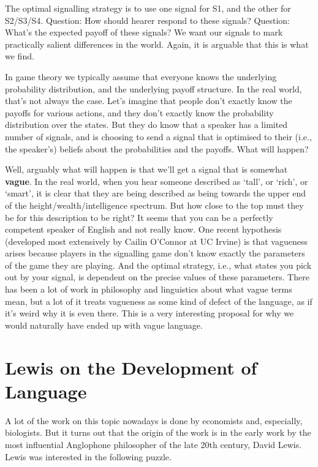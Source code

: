 \documentclass[11pt,]{article}
\begin{document}
The optimal signalling strategy is to use one signal for S1, and the
other for S2/S3/S4. Question: How should hearer respond to these
signals? Question: What's the expected payoff of these signals? We want
our signals to mark practically salient differences in the world. Again,
it is arguable that this is what we find.

In game theory we typically assume that everyone knows the underlying
probability distribution, and the underlying payoff structure. In the
real world, that's not always the case. Let's imagine that people don't
exactly know the payoffs for various actions, and they don't exactly
know the probability distribution over the states. But they do know that
a speaker has a limited number of signals, and is choosing to send a
signal that is optimised to their (i.e., the speaker's) beliefs about
the probabilities and the payoffs. What will happen?

Well, arguably what will happen is that we'll get a signal that is
somewhat \textbf{vague}. In the real world, when you hear someone
described as `tall', or `rich', or `smart', it is clear that they are
being described as being towards the upper end of the
height/wealth/intelligence spectrum. But how close to the top must they
be for this description to be right? It seems that you can be a
perfectly competent speaker of English and not really know. One recent
hypothesis (developed most extensively by Cailin O'Connor at UC Irvine)
is that vagueness arises because players in the signalling game don't
know exactly the parameters of the game they are playing. And the
optimal strategy, i.e., what states you pick out by your signal, is
dependent on the precise values of these parameters. There has been a
lot of work in philosophy and linguistics about what vague terms mean,
but a lot of it treats vagueness as some kind of defect of the language,
as if it's weird why it is even there. This is a very interesting
proposal for why we would naturally have ended up with vague language.

\hypertarget{lewis-on-the-development-of-language}{%
\section{Lewis on the Development of
Language}\label{lewis-on-the-development-of-language}}

A lot of the work on this topic nowadays is done by economists and,
especially, biologists. But it turns out that the origin of the work is
in the early work by the most influential Anglophone philosopher of the
late 20th century, David Lewis. Lewis was interested in the following
puzzle.
\end{document}
